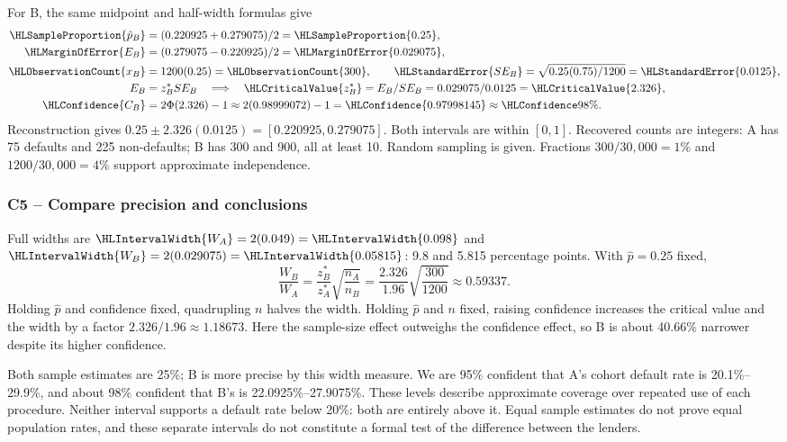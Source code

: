 For B, the same midpoint and half-width formulas give
\begin{align*}
\HLSampleProportion{\hat p_B}&=(0.220925+0.279075)/2=\HLSampleProportion{0.25},\\
\HLMarginOfError{E_B}&=(0.279075-0.220925)/2=\HLMarginOfError{0.029075},\\
\HLObservationCount{x_B}&=1200(0.25)=\HLObservationCount{300},\qquad
\HLStandardError{SE_B}=\sqrt{0.25(0.75)/1200}=\HLStandardError{0.0125},\\
E_B&=z_B^*SE_B\quad\Longrightarrow\quad
\HLCriticalValue{z_B^*}=E_B/SE_B=0.029075/0.0125=\HLCriticalValue{2.326},\\
\HLConfidence{C_B}&=2\Phi(2.326)-1\approx2(0.98999072)-1
=\HLConfidence{0.97998145}\approx\HLConfidence{98\%}.
\end{align*}
Reconstruction gives $0.25\pm2.326(0.0125)=[0.220925,0.279075]$. Both intervals are within $[0,1]$. Recovered counts are integers: A has 75 defaults and 225 non-defaults; B has 300 and 900, all at least 10. Random sampling is given. Fractions $300/30{,}000=1\%$ and $1200/30{,}000=4\%$ support approximate independence.

\subsubsection*{C5 -- Compare precision and conclusions}\label{sol:c5-advanced-b}
Full widths are $\HLIntervalWidth{W_A}=2(0.049)=\HLIntervalWidth{0.098}$ and $\HLIntervalWidth{W_B}=2(0.029075)=\HLIntervalWidth{0.05815}$: 9.8 and 5.815 percentage points. With $\hat p=0.25$ fixed,
\[
\frac{W_B}{W_A}=\frac{z_B^*}{z_A^*}\sqrt{\frac{n_A}{n_B}}
=\frac{2.326}{1.96}\sqrt{\frac{300}{1200}}
\approx0.59337.
\]
Holding $\hat p$ and confidence fixed, quadrupling $n$ halves the width. Holding $\hat p$ and $n$ fixed, raising confidence increases the critical value and the width by a factor $2.326/1.96\approx1.18673$. Here the sample-size effect outweighs the confidence effect, so B is about 40.66\% narrower despite its higher confidence.

Both sample estimates are 25\%; B is more precise by this width measure. We are 95\% confident that A's cohort default rate is 20.1\%--29.9\%, and about 98\% confident that B's is 22.0925\%--27.9075\%. These levels describe approximate coverage over repeated use of each procedure. Neither interval supports a default rate below 20\%: both are entirely above it. Equal sample estimates do not prove equal population rates, and these separate intervals do not constitute a formal test of the difference between the lenders.

